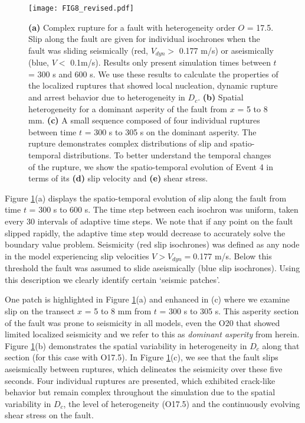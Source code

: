 \documentclass[preprint,1p, 10pt,authoryear]{elsarticle}
\begin{document}
\begin{figure}
	\centering
	\texttt{[image: FIG8\_revised.pdf]} 
	\caption{\textbf{(a)} Complex rupture for a fault with heterogeneity order $O$ = 17.5. Slip along the fault are given for individual isochrones when the fault was sliding seismically (red, $V_{dyn}>$ 0.177 m/s) or aseismically (blue, $V <$ 0.1m/s).  Results only present simulation times between $t$ = 300 s and 600 s. We use these results to calculate the properties of the localized ruptures that showed local nucleation, dynamic rupture and arrest behavior due to heterogeneity in $D_{c}$. \textbf{(b)} Spatial heterogeneity for a dominant asperity of the fault from $x$ = 5 to 8 mm. \textbf{(c)} A small sequence composed of four individual ruptures between time $t$ = 300 s to 305 s on the dominant asperity. The rupture demonstrates complex distributions of slip and spatio-temporal distributions. To better understand the temporal changes of the rupture, we show the spatio-temporal evolution of Event 4 in terms of its \textbf{(d)} slip velocity and \textbf{(e)} shear stress.}
	\label{fig8}
\end{figure}

Figure \ref{fig8}(a) displays the spatio-temporal evolution of slip along the fault from time $t$ = 300 s to 600 s. The time step between each isochron was uniform, taken every 30 intervals of adaptive time steps.  We note that if any point on the fault slipped rapidly, the adaptive time step would decrease to accurately solve the boundary value problem. Seismicity (red slip isochrones) was defined as any node in the model experiencing slip velocities $V > V_{dyn}=$0.177 m/s. Below this threshold the fault was assumed to slide aseismically (blue slip isochrones). Using this description we clearly identify certain `seismic patches'.

One patch is highlighted in Figure \ref{fig8}(a) and enhanced in (c) where we examine slip on the transect $x$ = 5 to 8 mm from $t$ = 300 s to 305 s.  This asperity section of the fault was prone to seismicity in all models, even the O20 that showed limited localized seismicity and we refer to this as \textit{dominant asperity} from herein. Figure \ref{fig8}(b) demonstrates the spatial variability in heterogeneity in $D_{c}$ along that section (for this case with O17.5). In Figure \ref{fig8}(c), we see that the fault slips aseismically between ruptures, which delineates the seismicity over these five seconds. Four individual ruptures are presented, which exhibited crack-like behavior but remain complex throughout the simulation due to the spatial variability in $D_{c}$, the level of heterogeneity (O17.5) and the continuously evolving shear stress on the fault.
\end{document}
